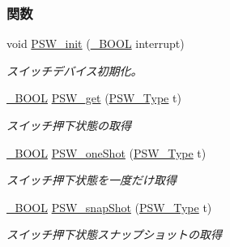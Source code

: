 \subsubsection*{関数}
\begin{DoxyCompactItemize}
\item 
void \hyperlink{push__switch_8h_a94048eedccacd964c5d7523ab9339619_a94048eedccacd964c5d7523ab9339619}{P\+S\+W\+\_\+init} (\hyperlink{stddef_8h_afbf708854fe02af8475a9ba02f3196cb_afbf708854fe02af8475a9ba02f3196cb}{\+\_\+\+B\+O\+O\+L} interrupt)
\begin{DoxyCompactList}\small\item\em スイッチデバイス初期化。 \end{DoxyCompactList}\item 
\hyperlink{stddef_8h_afbf708854fe02af8475a9ba02f3196cb_afbf708854fe02af8475a9ba02f3196cb}{\+\_\+\+B\+O\+O\+L} \hyperlink{push__switch_8h_a8f454027db6f5d98b8ee38f6efebc1d8_a8f454027db6f5d98b8ee38f6efebc1d8}{P\+S\+W\+\_\+get} (\hyperlink{push__switch_8h_a66564168132ca9f7124309ee5b555b0c_a66564168132ca9f7124309ee5b555b0c}{P\+S\+W\+\_\+\+Type} t)
\begin{DoxyCompactList}\small\item\em スイッチ押下状態の取得 \end{DoxyCompactList}\item 
\hyperlink{stddef_8h_afbf708854fe02af8475a9ba02f3196cb_afbf708854fe02af8475a9ba02f3196cb}{\+\_\+\+B\+O\+O\+L} \hyperlink{push__switch_8h_a4c4bdfcba186bc9b2a1e8769c88e4746_a4c4bdfcba186bc9b2a1e8769c88e4746}{P\+S\+W\+\_\+one\+Shot} (\hyperlink{push__switch_8h_a66564168132ca9f7124309ee5b555b0c_a66564168132ca9f7124309ee5b555b0c}{P\+S\+W\+\_\+\+Type} t)
\begin{DoxyCompactList}\small\item\em スイッチ押下状態を一度だけ取得 \end{DoxyCompactList}\item 
\hyperlink{stddef_8h_afbf708854fe02af8475a9ba02f3196cb_afbf708854fe02af8475a9ba02f3196cb}{\+\_\+\+B\+O\+O\+L} \hyperlink{push__switch_8h_a4059e91200d2a27e3e893c727cccfd5b_a4059e91200d2a27e3e893c727cccfd5b}{P\+S\+W\+\_\+snap\+Shot} (\hyperlink{push__switch_8h_a66564168132ca9f7124309ee5b555b0c_a66564168132ca9f7124309ee5b555b0c}{P\+S\+W\+\_\+\+Type} t)
\begin{DoxyCompactList}\small\item\em スイッチ押下状態スナップショットの取得 \end{DoxyCompactList}\end{DoxyCompactItemize}


